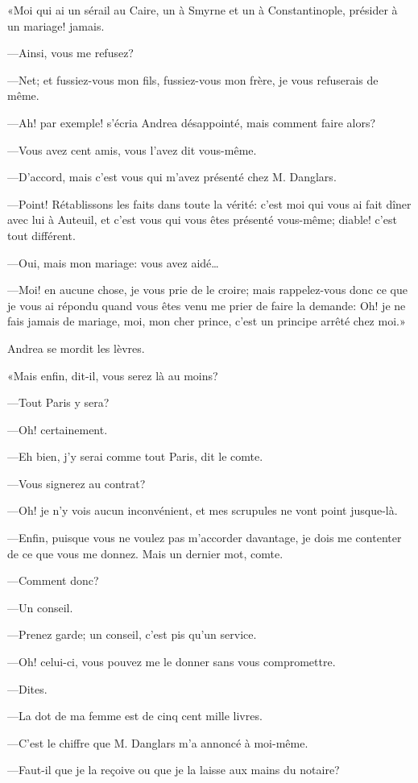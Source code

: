 «Moi qui ai un sérail au Caire, un à Smyrne et un à Constantinople, présider à un mariage! jamais. 

—Ainsi, vous me refusez? 

—Net; et fussiez-vous mon fils, fussiez-vous mon frère, je vous refuserais de même. 

—Ah! par exemple! s'écria Andrea désappointé, mais comment faire alors? 

—Vous avez cent amis, vous l'avez dit vous-même. 

—D'accord, mais c'est vous qui m'avez présenté chez M. Danglars. 

—Point! Rétablissons les faits dans toute la vérité: c'est moi qui vous ai fait dîner avec lui à Auteuil, et c'est vous qui vous êtes présenté vous-même; diable! c'est tout différent. 

—Oui, mais mon mariage: vous avez aidé\dots 

—Moi! en aucune chose, je vous prie de le croire; mais rappelez-vous donc ce que je vous ai répondu quand vous êtes venu me prier de faire la demande: Oh! je ne fais jamais de mariage, moi, mon cher prince, c'est un principe arrêté chez moi.» 

Andrea se mordit les lèvres. 

«Mais enfin, dit-il, vous serez là au moins? 

—Tout Paris y sera? 

—Oh! certainement. 

—Eh bien, j'y serai comme tout Paris, dit le comte. 

—Vous signerez au contrat? 

—Oh! je n'y vois aucun inconvénient, et mes scrupules ne vont point jusque-là. 

—Enfin, puisque vous ne voulez pas m'accorder davantage, je dois me contenter de ce que vous me donnez. Mais un dernier mot, comte. 

—Comment donc? 

—Un conseil. 

—Prenez garde; un conseil, c'est pis qu'un service. 

—Oh! celui-ci, vous pouvez me le donner sans vous compromettre. 

—Dites. 

—La dot de ma femme est de cinq cent mille livres. 

—C'est le chiffre que M. Danglars m'a annoncé à moi-même. 

—Faut-il que je la reçoive ou que je la laisse aux mains du notaire? 

